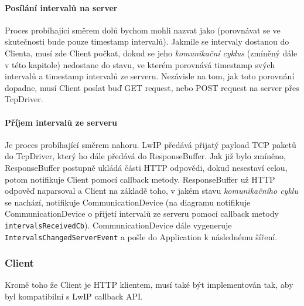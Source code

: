 \paragraph{Posílání intervalů na server}
Proces probíhající směrem dolů bychom mohli nazvat jako  (porovnávat se ve skutečnosti bude
pouze timestamp intervalů).
Jakmile se intervaly dostanou do Clienta, musí zde Client počkat, dokud se jeho \emph{komunikační cyklus}
(zmíněný dále v této kapitole) nedostane do stavu, ve kterém porovnává timestamp svých intervalů
a timestamp intervalů ze serveru.
Nezávisle na tom, jak toto porovnání dopadne, musí Client poslat buď GET request, nebo POST request
na server přes TcpDriver.

\paragraph{Příjem intervalů ze serveru}
Je proces probíhající směrem nahoru.
LwIP předává přijatý payload TCP paketů do TcpDriver, který ho dále předává do ResponseBuffer.
Jak již bylo zmíněno, ResponseBuffer postupně ukládá části HTTP odpovědi, dokud nesestaví celou,
potom notifikuje Client pomocí callback metody.
ResponseBuffer už HTTP odpověď naparsoval a Client na základě toho, v jakém stavu \emph{komunikačního cyklu}
se nachází, notifikuje CommunicationDevice (na diagramu notifikuje CommunicationDevice o přijetí
intervalů ze serveru pomocí callback metody \texttt{intervalsReceivedCb}).
CommunicationDevice dále vygeneruje \texttt{IntervalsChangedServerEvent} a pošle do Application
k následnému šíření.

\subsubsection{Client}
Kromě toho že Client je HTTP klientem, musí také být implementován tak, aby byl kompatibilní s LwIP
callback API.

